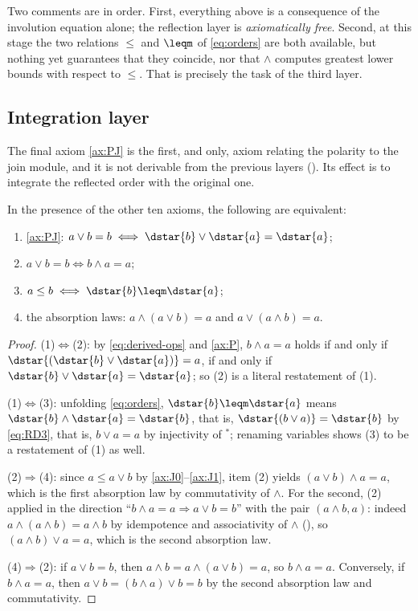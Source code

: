 Two comments are in order. First, everything above is a consequence of the
involution equation alone; the reflection layer is \emph{axiomatically
free}. Second, at this stage the two relations $\leq$ and $\leqm$ of
\eqref{eq:orders} are both available, but nothing yet guarantees that they
coincide, nor that $\wedge$ computes greatest lower bounds with respect to
$\leq$. That is precisely the task of the third layer.

\subsection{Integration layer}\label{subsec:integration}

The final axiom \eqref{ax:PJ} is the first, and only, axiom relating the
polarity to the join module, and it is not derivable from the previous
layers (). Its effect is to integrate the reflected
order with the original one.

\begin{proposition}\label{prop:order-compat}
In the presence of the other ten axioms, the following are equivalent:
\begin{enumerate}
  \item \eqref{ax:PJ}: $a \vee b = b \iff \dstar{b} \vee \dstar{a} = \dstar{a}$;
  \item $a \vee b = b \iff b \wedge a = a$;
  \item $a \leq b \iff \dstar{b} \leqm \dstar{a}$;
  \item the absorption laws:
  $a \wedge (a \vee b) = a$ and $a \vee (a \wedge b) = a$.
\end{enumerate}
\end{proposition}

\begin{proof}
(1)$\Leftrightarrow$(2): by \eqref{eq:derived-ops} and \eqref{ax:P},
$b \wedge a = a$ holds if and only if
$\dstar{(\dstar{b} \vee \dstar{a})} = a$, if and only if
$\dstar{b} \vee \dstar{a} = \dstar{a}$; so (2) is a literal restatement of
(1).

(1)$\Leftrightarrow$(3): unfolding \eqref{eq:orders},
$\dstar{b} \leqm \dstar{a}$ means $\dstar{b} \wedge \dstar{a} = \dstar{b}$,
that is, $\dstar{(b \vee a)} = \dstar{b}$ by \eqref{eq:RD3}, that is,
$b \vee a = a$ by injectivity of ${}^{*}$; renaming variables shows (3) to
be a restatement of (1) as well.

(2)$\Rightarrow$(4): since $a \leq a \vee b$ by
\eqref{ax:J0}--\eqref{ax:J1}, item (2) yields
$(a \vee b) \wedge a = a$, which is the first absorption law by
commutativity of $\wedge$. For the second, (2) applied in the direction
``$b \wedge a = a \Rightarrow a \vee b = b$'' with the pair
$(a \wedge b, a)$: indeed $a \wedge (a \wedge b) = a \wedge b$ by
idempotence and associativity of $\wedge$
(), so $(a \wedge b) \vee a = a$, which is
the second absorption law.

(4)$\Rightarrow$(2): if $a \vee b = b$, then
$a \wedge b = a \wedge (a \vee b) = a$, so $b \wedge a = a$. Conversely, if
$b \wedge a = a$, then $a \vee b = (b \wedge a) \vee b = b$ by the second
absorption law and commutativity.
\end{proof}

